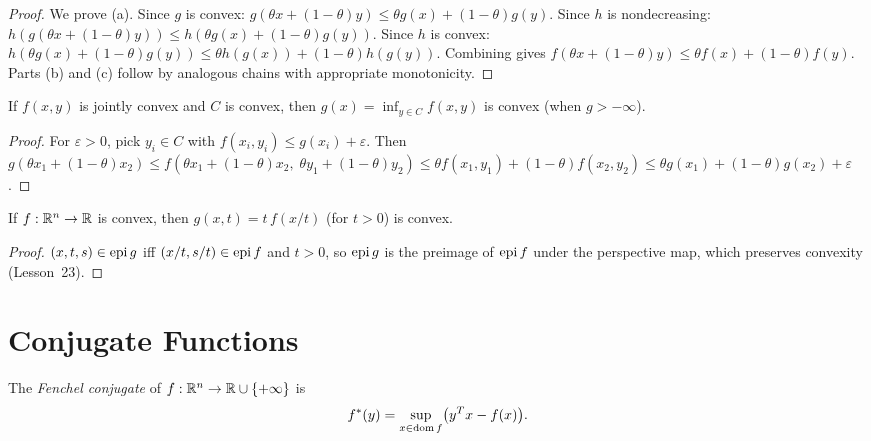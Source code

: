 \documentclass[11pt,a4paper]{article}
\begin{document}
\begin{proof}
We prove (a).  Since $g$ is convex:
$g(\theta x + (1-\theta)y) \le \theta g(x) + (1-\theta) g(y)$.
Since $h$ is nondecreasing:
$h(g(\theta x + (1-\theta)y)) \le h(\theta g(x) + (1-\theta) g(y))$.
Since $h$ is convex:
$h(\theta g(x) + (1-\theta) g(y)) \le \theta h(g(x)) + (1-\theta) h(g(y))$.
Combining gives $f(\theta x + (1-\theta)y) \le \theta f(x) + (1-\theta)f(y)$.
Parts (b) and (c) follow by analogous chains with appropriate monotonicity.
\end{proof}

\begin{proposition}
\label{prop:partial-min}
If $f(x,y)$ is jointly convex and $C$ is convex, then
$g(x) = \inf_{y \in C} f(x,y)$ is convex (when $g > -\infty$).
\end{proposition}

\begin{proof}
For $\varepsilon > 0$, pick $y_i \in C$ with $f(x_i, y_i) \le g(x_i) +
\varepsilon$.  Then $g(\theta x_1 + (1-\theta) x_2) \le f(\theta x_1 +
(1-\theta) x_2,\; \theta y_1 + (1-\theta) y_2) \le \theta f(x_1, y_1) +
(1-\theta) f(x_2, y_2) \le \theta g(x_1) + (1-\theta) g(x_2) + \varepsilon$.
\end{proof}

\begin{proposition}
\label{prop:perspective-function}
If $f : \mathbb{R}^n \to \mathbb{R}$ is convex, then $g(x, t) = t\, f(x/t)$ (for $t > 0$)
is convex.
\end{proposition}

\begin{proof}
$(x, t, s) \in \operatorname{epi} g$ iff $(x/t, s/t) \in \operatorname{epi} f$ and $t > 0$, so $\operatorname{epi} g$
is the preimage of $\operatorname{epi} f$ under the perspective map, which preserves
convexity (Lesson~23).
\end{proof}


\section{Conjugate Functions}

\begin{definition}
\label{def:conjugate}
The \emph{Fenchel conjugate} of $f : \mathbb{R}^n \to \mathbb{R} \cup \{+\infty\}$ is
\[
  f^*(y) = \sup_{x \in \operatorname{dom} f} \bigl(y^T x - f(x)\bigr).
\]
\end{definition}
\end{document}
